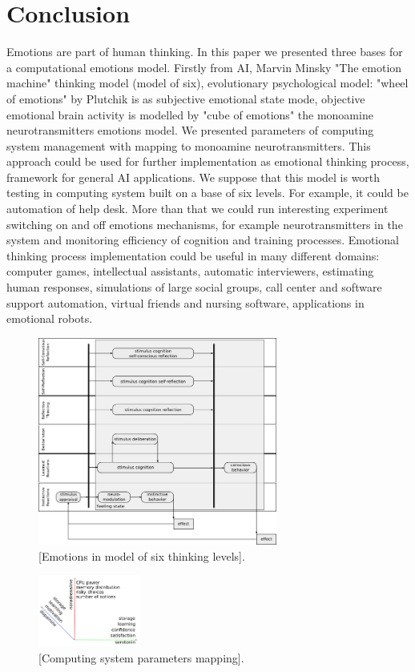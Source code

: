 \section{Conclusion}

Emotions are part of human thinking. In this paper we presented three bases for a computational emotions model. Firstly from AI, Marvin Minsky "The emotion machine" \cite{emotionmachine} thinking model (model of six), evolutionary psychological model: "wheel of emotions" by Plutchik \cite{natureofemotions} is as subjective emotional state mode, objective emotional brain activity is modelled by "cube of emotions" the monoamine neurotransmitters emotions model. We presented parameters of computing system management with mapping to monoamine neurotransmitters. This approach could be used for further implementation as emotional thinking process, framework for general AI applications. We suppose that this model is worth testing in computing system built on a base of six levels. For example, it could be automation of help desk. More than that we could run interesting experiment switching on and off emotions mechanisms, for example neurotransmitters in the system and monitoring efficiency of cognition and training processes. Emotional thinking process implementation could be useful in many different domains: computer games, intellectual assistants, automatic interviewers, estimating human responses, simulations of large social groups, call center and software support automation, virtual friends and nursing software, applications in emotional robots.

\begin{figure}[h!]
 \centering
 \includegraphics[width=0.7\textwidth]{six_levels_of_emotions}
 \caption{[Emotions in model of six thinking levels].}
\end{figure}

\begin{figure}[h!]
 \centering
 \includegraphics[width=0.3\textwidth]{parameters_mapping180}
 \caption{[Computing system parameters mapping].}
\end{figure}